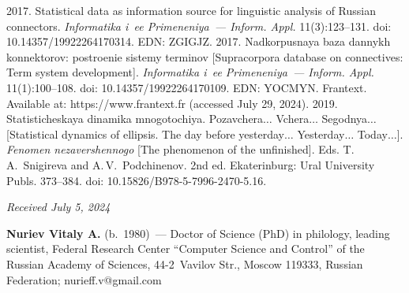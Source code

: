 \begin{multicols}{2}
{{\begin{thebibliography}{99}
 2017. Statistical data as information source 
for linguistic analysis of Russian connectors. \textit{Informatika i~ee 
Primeneniya~--- Inform. Appl.} 11(3):123--131. doi: 10.14357/19922264170314. 
EDN: ZGIGJZ.
 2017. 
Nadkorpusnaya baza dannykh konnektorov: postroenie sistemy terminov 
[Supracorpora database on connectives: Term system development]. \textit{Informatika 
i~ee Primeneniya~--- Inform. Appl.} 11(1):100--108. doi: 
10.14357/19922264170109. EDN: YOCMYN.
Frantext. Available at: https://www.frantext.fr (accessed July 29, 2024).
 2019. Statisticheskaya dinamika mnogotochiya. 
Pozavchera$\ldots$ Vchera$\ldots$ Segodnya$\ldots$ [Statistical dynamics of 
ellipsis. The day before yesterday$\ldots$ Yesterday$\ldots$ Today$\ldots$]. 
\textit{Fenomen nezavershennogo} [The phenomenon of the unfinished].  
Eds. T.\,A.~Snigireva and A.\,V.~Podchinenov. 2nd ed.  Ekaterinburg: Ural University Publs. 
373--384. doi: 10.15826/B978-5-7996-2470-5.16.
     
 
     \end{thebibliography} } }

\end{multicols}

\vspace*{-6pt}

\hfill{\small\textit{Received July 5, 2024}}

\vspace*{-18pt}

 \Contrl
  
  \noindent
  \textbf{Nuriev Vitaly A.} (b.\ 1980)~--- Doctor of Science (PhD) in philology, leading 
scientist, Federal Research Center ``Computer Science and Control'' of the Russian Academy of 
Sciences, 44-2~Vavilov Str., Moscow 119333, Russian Federation; 
\mbox{nurieff.v@gmail.com} 







\newpage

\vspace*{-28pt}

\def\tit{КОМПЬЮТЕРНЫЕ ИНСТРУМЕНТЫ ДЛЯ~ОБРАБОТКИ ПУНКТУАЦИОННОГО КОМПОНЕНТА\\ 
В~ХУДОЖЕСТВЕННОМ ПЕРЕВОДЕ$^*$}

